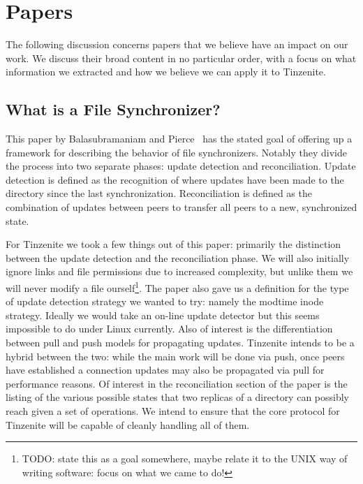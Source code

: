 \section{Papers}
\label{sec:Papers}

The following discussion concerns papers that we believe have an impact on our work.
We discuss their broad content in no particular order, with a focus on what information we extracted and how we believe we can apply it to Tinzenite.

\subsection{What is a File Synchronizer?}
\label{sub:What is a File Synchronizer?}

This paper by Balasubramaniam and Pierce~\cite{balasubramaniam1998file} has the stated goal of offering up a framework for describing the behavior of file synchronizers.
Notably they divide the process into two separate phases: update detection and reconciliation.
Update detection is defined as the recognition of where updates have been made to the directory since the last synchronization.
Reconciliation is defined as the combination of updates between peers to transfer all peers to a new, synchronized state.

For Tinzenite we took a few things out of this paper: primarily the distinction between the update detection and the reconciliation phase.
We will also initially ignore links and file permissions due to increased complexity, but unlike them we will never modify a file ourself\footnote{TODO: state this as a goal somewhere, maybe relate it to the UNIX way of writing software: focus on what we came to do!}.
The paper also gave us a definition for the type of update detection strategy we wanted to try: namely the modtime inode strategy.
Ideally we would take an on-line update detector but this seems impossible to do under Linux currently.
Also of interest is the differentiation between pull and push models for propagating updates.
Tinzenite intends to be a hybrid between the two: while the main work will be done via push, once peers have established a connection updates may also be propagated via pull for performance reasons.
Of interest in the reconciliation section of the paper is the listing of the various possible states that two replicas of a directory can possibly reach given a set of operations.
We intend to ensure that the core protocol for Tinzenite will be capable of cleanly handling all of them.


